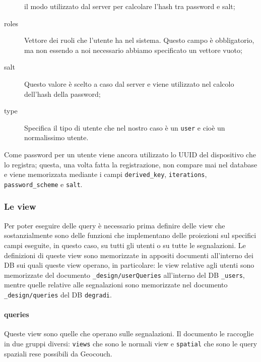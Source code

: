 \begin{description}
                    il modo utilizzato dal server per calcolare l'hash tra
                    password e salt;
                    \item[roles] Vettore dei ruoli che l'utente ha nel
                    sistema. Questo campo è obbligatorio, ma non essendo a noi
                    necessario abbiamo specificato un vettore vuoto;
                    \item[salt] Questo valore è scelto a caso dal server e
                    viene utilizzato nel calcolo dell'hash della password;
                    \item[type] Specifica il tipo di utente che nel nostro
                    caso è un \texttt{user} e cioè un normalissimo utente.
                \end{description}
                Come password per un utente viene ancora utilizzato lo UUID
                del dispositivo che lo registra; questa, una volta fatta la
                registrazione, non compare mai nel database e viene
                memorizzata mediante i campi \texttt{derived\_key},
                \texttt{iterations}, \texttt{password\_scheme} e \texttt{salt}.

            \subsubsection{Le view}
                Per poter eseguire delle query è necessario prima definire
                delle view che sostanzialmente sono delle funzioni che
                implementano delle proiezioni sul specifici campi eseguite, in
                questo caso, su tutti gli utenti o su tutte le segnalazioni.
                Le definizioni di queste view sono memorizzate in appositi
                documenti all'interno dei DB sui quali queste view operano, in
                particolare: le view relative agli utenti sono memorizzate del
                documento \texttt{\_design/userQueries} all'interno del DB
                \texttt{\_users}, mentre quelle relative alle segnalazioni
                sono memorizzate nel documento \texttt{\_design/queries} del
                DB \texttt{degradi}.

                \paragraph{queries} Queste view sono quelle che operano sulle
                segnalazioni. Il documento le raccoglie in due gruppi diversi:
                \texttt{views} che sono le normali view e \texttt{spatial} che
                sono le query spaziali rese possibili da Geocouch.

